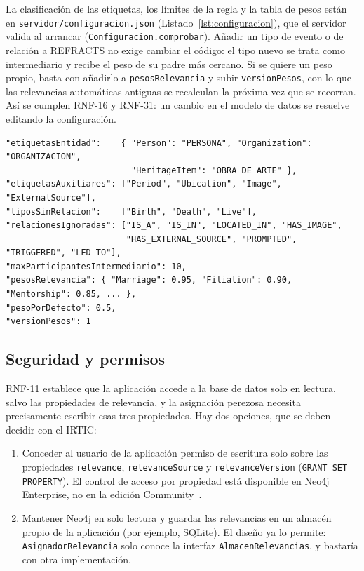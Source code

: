 La clasificación de las etiquetas, los límites de la regla y la tabla de pesos están en \texttt{servidor/configuracion.json} (Listado~\ref{lst:configuracion}), que el servidor valida al arrancar (\texttt{Configuracion.comprobar}). Añadir un tipo de evento o de relación a REFRACTS no exige cambiar el código: el tipo nuevo se trata como intermediario y recibe el peso de su padre más cercano. Si se quiere un peso propio, basta con añadirlo a \texttt{pesosRelevancia} y subir \texttt{versionPesos}, con lo que las relevancias automáticas antiguas se recalculan la próxima vez que se recorran. Así se cumplen RNF-16 y RNF-31: un cambio en el modelo de datos se resuelve editando la configuración.

\begin{lstlisting}[style=codigo, caption={Fragmento de \texttt{configuracion.json}.}, label={lst:configuracion}]
"etiquetasEntidad":    { "Person": "PERSONA", "Organization": "ORGANIZACION",
                         "HeritageItem": "OBRA_DE_ARTE" },
"etiquetasAuxiliares": ["Period", "Ubication", "Image", "ExternalSource"],
"tiposSinRelacion":    ["Birth", "Death", "Live"],
"relacionesIgnoradas": ["IS_A", "IS_IN", "LOCATED_IN", "HAS_IMAGE",
                        "HAS_EXTERNAL_SOURCE", "PROMPTED", "TRIGGERED", "LED_TO"],
"maxParticipantesIntermediario": 10,
"pesosRelevancia": { "Marriage": 0.95, "Filiation": 0.90, "Mentorship": 0.85, ... },
"pesoPorDefecto": 0.5,
"versionPesos": 1
\end{lstlisting}

\subsection{Seguridad y permisos}

RNF-11 establece que la aplicación accede a la base de datos solo en lectura, salvo las propiedades de relevancia, y la asignación perezosa necesita precisamente escribir esas tres propiedades. Hay dos opciones, que se deben decidir con el IRTIC:
\begin{enumerate}
  \item Conceder al usuario de la aplicación permiso de escritura solo sobre las propiedades \texttt{relevance}, \texttt{relevanceSource} y \texttt{relevanceVersion} (\texttt{GRANT SET PROPERTY}). El control de acceso por propiedad está disponible en Neo4j Enterprise, no en la edición Community~\cite{neo4jprivilegios}.
  \item Mantener Neo4j en solo lectura y guardar las relevancias en un almacén propio de la aplicación (por ejemplo, SQLite). El diseño ya lo permite: \texttt{AsignadorRelevancia} solo conoce la interfaz \texttt{AlmacenRelevancias}, y bastaría con otra implementación.
\end{enumerate}

